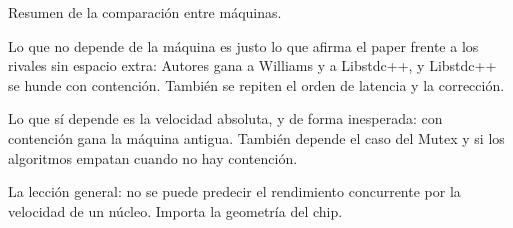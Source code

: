 Resumen de la comparación entre máquinas.

Lo que no depende de la máquina es justo lo que afirma el paper frente a los rivales sin espacio extra: Autores gana a Williams y a Libstdc++, y Libstdc++ se hunde con contención. También se repiten el orden de latencia y la corrección.

Lo que sí depende es la velocidad absoluta, y de forma inesperada: con contención gana la máquina antigua. También depende el caso del Mutex y si los algoritmos empatan cuando no hay contención.

La lección general: no se puede predecir el rendimiento concurrente por la velocidad de un núcleo. Importa la geometría del chip.
